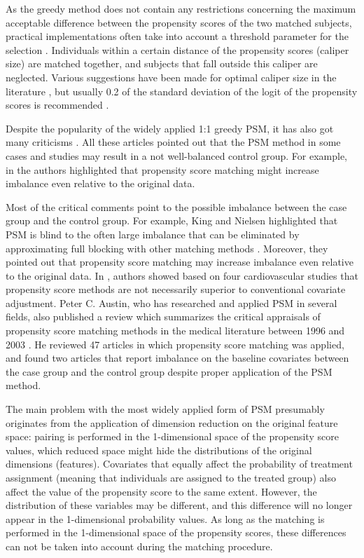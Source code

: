 As the greedy method does not contain any restrictions concerning the maximum acceptable difference between the propensity scores of the two matched subjects, practical implementations often take into account a threshold parameter for the selection \cite{austin2011optimal}. Individuals within a certain distance of the propensity scores (caliper size) are matched together, and subjects that fall outside this caliper are neglected. Various suggestions have been made for optimal caliper size in the literature \cite{austin2011optimal, wang2013optimal, lee2016matching}, but usually 0.2 of the standard deviation of the logit of the propensity scores is recommended \cite{austin2011optimal}.

Despite the popularity of the widely applied 1:1 greedy PSM, it has also got many criticisms \cite{austin2008critical, pell2008selection, biondi2011propensity, mansournia2018case, king2019propensity, moser2019out, wan2019matched}. All these articles pointed out that the PSM method in some cases and studies may result in a not well-balanced control group. For example, in \cite{king2019propensity} the authors highlighted that propensity score matching might increase imbalance even relative to the original data.

Most of the critical comments point to the possible imbalance between the case group and the control group. For example, King and Nielsen highlighted that PSM is blind to the often large imbalance that can be eliminated by approximating full blocking with other matching methods \cite{king2019propensity}. Moreover, they pointed out that propensity score matching may increase imbalance even relative to the original data. In \cite{elze2017comparison}, authors showed based on four cardiovascular studies that propensity score methods are not necessarily superior to conventional covariate adjustment. Peter C. Austin, who has researched and applied PSM in several fields, also published a review which summarizes the critical appraisals of propensity score matching methods in the medical literature between 1996 and 2003 \cite{austin2008critical}. He reviewed 47 articles in which propensity score matching was applied, and found two articles that report imbalance on the baseline covariates between the case group and the control group despite proper application of the PSM method.

The main problem with the most widely applied form of PSM presumably originates from the application of dimension reduction on the original feature space: pairing is performed in the 1-dimensional space of the propensity score values, which reduced space might hide the distributions of the original dimensions (features). Covariates that equally affect the probability of treatment assignment (meaning that individuals are assigned to the treated group) also affect the value of the propensity score to the same extent. However, the distribution of these variables may be different, and this difference will no longer appear in the 1-dimensional probability values. As long as the matching is performed in the 1-dimensional space of the propensity scores, these differences can not be taken into account during the matching procedure.

